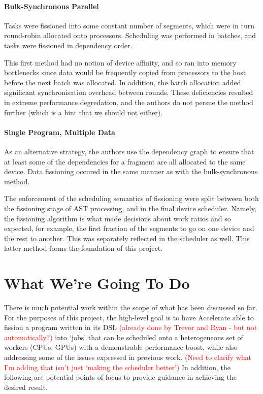 \documentclass[a4paper,12pt]{article}
\newcommand{\red}[1]{\textcolor{red}{#1}}
\begin{document}
\paragraph*{Bulk-Synchronous Parallel} 
Tasks were fissioned into some constant number of segments, which were in turn round-robin allocated onto processors.
Scheduling was performed in batches, and tasks were fissioned in dependency order.

This first method had no notion of device affinity, and so ran into memory bottlenecks since data would be frequently copied from processors to the host before the next batch was allocated.
In addition, the batch allocation added significant synchronisation overhead between rounds.
These deficiencies resulted in extreme performance degredation, and the authors do not persue the method further (which is a hint that we should not either).

\paragraph*{Single Program, Multiple Data}
As an alternative strategy, the authors use the dependency graph to ensure that at least some of the dependencies for a fragment are all allocated to the same device.
Data fissioning occured in the same manner as with the bulk-synchronous method.

The enforcement of the scheduling semantics of fissioning were split between both the fissioning stage of AST processing, and in the final device scheduler.
Namely, the fissioning algorithm is what made decisions about work ratios and so expected, for example, the first fraction of the segments to go on one device and the rest to another.
This was separately reflected in the scheduler as well. This latter method forms the foundation of this project.

\section{What We're Going To Do}
There is much potential work within the scope of what has been discussed so far.
For the purposes of this project, the high-level goal is to have Accelerate able to fission a program written in its DSL \red{(already done by Trevor and Ryan - but not automatically?)} into `jobs' that can be scheduled onto a heterogeneous set of workers (CPUs, GPUs) with a demonstrable performance boost, while also addressing some of the issues expressed in previous work.
\red{(Need to clarify what I'm adding that isn't just `making the scheduler better')}
In addition, the following are potential points of focus to provide guidance in achieving the desired result.
\end{document}
